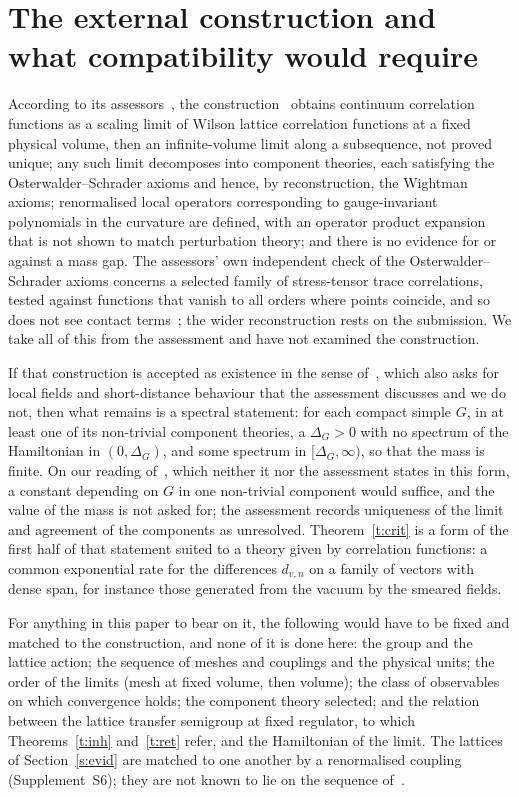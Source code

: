 \section{The external construction and what compatibility would require}\label{s:ext}
According to its assessors~\cite[pp.~1, 3]{YMG}, the construction~\cite{OAI} obtains continuum correlation
functions as a scaling limit of Wilson lattice correlation functions at a fixed physical volume, then an
infinite-volume limit along a subsequence, not proved unique; any such limit decomposes into component
theories, each satisfying the Osterwalder--Schrader axioms and hence, by reconstruction, the Wightman axioms;
renormalised local operators corresponding to gauge-invariant polynomials in the curvature are defined, with
an operator product expansion that is not shown to match perturbation theory; and there is no evidence for or
against a mass gap. The assessors' own independent check of the Osterwalder--Schrader axioms concerns a
selected family of stress-tensor trace correlations, tested against functions that vanish to all orders where
points coincide, and so does not see contact terms~\cite[Part~II]{YMG}; the wider reconstruction rests on
the submission. We take all of this from the assessment and have not examined the construction.

If that construction is accepted as existence in the sense of~\cite{JW}, which also asks for local fields and
short-distance behaviour that the assessment discusses and we do not, then what remains is a spectral
statement: for each compact simple $G$, in at least one of its non-trivial component theories, a $\Delta_G>0$
with no spectrum of the Hamiltonian in $(0,\Delta_G)$, and some spectrum in $[\Delta_G,\infty)$, so that the mass is finite.
On our reading of~\cite{JW}, which neither it nor the assessment states in this form, a constant depending
on $G$ in one non-trivial component would suffice, and the value of the mass is not asked for; the
assessment records uniqueness of the limit and agreement of the components as unresolved. Theorem~\ref{t:crit} is a form of the first half of that statement suited to a
theory given by correlation functions: a common exponential rate for the differences $d_{v,n}$ on a family of
vectors with dense span, for instance those generated from the vacuum by the smeared fields.

For anything in this paper to bear on it, the following would have to be fixed and matched to the
construction, and none of it is done here: the group and the lattice action; the sequence of meshes and
couplings and the physical units; the order of the limits (mesh at fixed volume, then volume); the class of
observables on which convergence holds; the component theory selected; and the relation between the lattice
transfer semigroup at fixed regulator, to which Theorems~\ref{t:inh} and~\ref{t:ret} refer, and the
Hamiltonian of the limit. The lattices of Section~\ref{s:evid} are matched to one another by a renormalised
coupling (Supplement~S6); they are not known to lie on the sequence of~\cite{OAI}.

